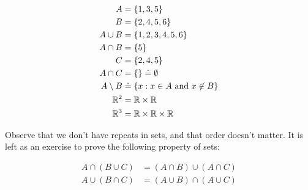 \begin{example}
	\begin{equation*}
		\begin{split}
			A & = \{1,3,5\} \\
			B & = \{2,4,5,6\} \\
			A \cup B &= \{1,2,3,4,5,6\} \\
			A \cap B & = \{5\} \\
			C & = \{2,4,5\} \\
			A \cap C & = \{\} \doteq \emptyset \\
			A \setminus B & \doteq \{ x: x \in A \ \text{and} \ x \not \in B\} \\
			\mathbb{R}^{2} & = \mathbb{R} \times \mathbb{R} \\
			\mathbb{R}^{3} & = \mathbb{R} \times \mathbb{R} \times \mathbb{R}
		\end{split}
	\end{equation*}
\end{example}
Observe that we don't have repeats in sets, and that order doesn't matter.
It is left as an exercise to prove the following property of sets:
\begin{lemma}
	\begin{equation*}
		\begin{split}
			A \cap (B \cup C) &= (A \cap B)  \cup (A \cap C) \\
			A \cup (B \cap C) &= (A \cup B)  \cap (A \cup C) 
		\end{split}
	\end{equation*}
\end{lemma}
